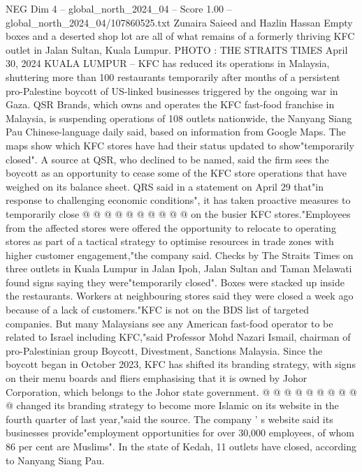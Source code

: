 \begin{textsample}{NEG Dim 4 – global\_north\_2024\_04 – Score 1.00 – global\_north\_2024\_04/107860525.txt}  \label{ex:f4_neg_094}
Zunaira Saieed and Hazlin Hassan Empty boxes and a deserted shop lot are all of what remains of a formerly thriving KFC outlet in Jalan Sultan, Kuala Lumpur.
PHOTO : THE STRAITS TIMES April 30, 2024 KUALA LUMPUR -- KFC has reduced its operations in Malaysia, shuttering more than 100 restaurants temporarily after months of a persistent pro-Palestine boycott of US-linked businesses triggered by the ongoing war in Gaza.
QSR Brands, which owns and operates the KFC fast-food franchise in Malaysia, is suspending operations of 108 outlets nationwide, the Nanyang Siang Pau Chinese-language daily said, based on information from Google Maps.
The maps show which KFC stores have had their status updated to show"temporarily closed".
A source at QSR, who declined to be named, said the firm sees the boycott as an opportunity to cease some of the KFC store operations that have weighed on its balance sheet.
QRS said in a statement on April 29 that"in response to challenging economic conditions", it has taken proactive measures to temporarily close @ @ @ @ @ @ @ @ @ @ on the busier KFC stores."Employees from the affected stores were offered the opportunity to relocate to operating stores as part of a tactical strategy to optimise resources in trade zones with higher customer engagement,"the company said.
Checks by The Straits Times on three outlets in Kuala Lumpur in Jalan Ipoh, Jalan Sultan and Taman Melawati found signs saying they were"temporarily closed".
Boxes were stacked up inside the restaurants.
Workers at neighbouring stores said they were closed a week ago because of a lack of customers."KFC is not on the BDS list of targeted companies.
But many Malaysians see any American fast-food operator to be related to Israel including KFC,"said Professor Mohd Nazari Ismail, chairman of pro-Palestinian group Boycott, Divestment, Sanctions Malaysia.
Since the boycott began in October 2023, KFC has shifted its branding strategy, with signs on their menu boards and fliers emphasising that it is owned by Johor Corporation, which belongs to the Johor state government. @ @ @ @ @ @ @ @ @ @ changed its branding strategy to become more Islamic on its website in the fourth quarter of last year,"said the source.
The company ' s website said its businesses provide"employment opportunities for over 30,000 employees, of whom 86 per cent are Muslims".
In the state of Kedah, 11 outlets have closed, according to Nanyang Siang Pau.

\end{textsample}
